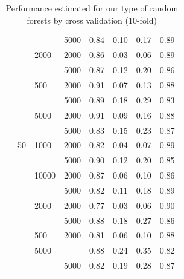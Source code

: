 \documentclass[a4paper,10pt]{article}
\begin{document}
\begin{table}[!ht]
\begin{footnotesize}
\begin{tabular}{llllrrrr}
     &    &      & 5000 &       0.84 &       0.10 &       0.17 &       0.89 \\
     &    & 2000 & 2000 &       0.86 &       0.03 &       0.06 &       0.89 \\
     &    &      & 5000 &       0.87 &       0.12 &       0.20 &       0.86 \\
     &    & 500 & 2000 &       0.91 &       0.07 &       0.13 &       0.88 \\
     &    &      & 5000 &       0.89 &       0.18 &       0.29 &       0.83 \\
     &    & 5000 & 2000 &       0.91 &       0.09 &       0.16 &       0.88 \\
     &    &      & 5000 &       0.83 &       0.15 &       0.23 &       0.87 \\
     & 50 & 1000 & 2000 &       0.82 &       0.04 &       0.07 &       0.89 \\
     &    &      & 5000 &       0.90 &       0.12 &       0.20 &       0.85 \\
     &    & 10000 & 2000 &       0.87 &       0.06 &       0.10 &       0.86 \\
     &    &      & 5000 &       0.82 &       0.11 &       0.18 &       0.89 \\
     &    & 2000 & 2000 &       0.77 &       0.03 &       0.06 &       0.90 \\
     &    &      & 5000 &       0.88 &       0.18 &       0.27 &       0.86 \\
     &    & 500 & 2000 &       0.81 &       0.06 &       0.10 &       0.88 \\
     &    & 5000 &      &       0.88 &       0.24 &       0.35 &       0.82 \\
     &    &      & 5000 &       0.82 &       0.19 &       0.28 &       0.87 \\
\bottomrule

\end{tabular}
\end{footnotesize}
\caption{Performance estimated for our type of random forests by cross validation (10-fold)}
\label{Cross_val: RF}
\end{table}
\newpage



\end{document}
